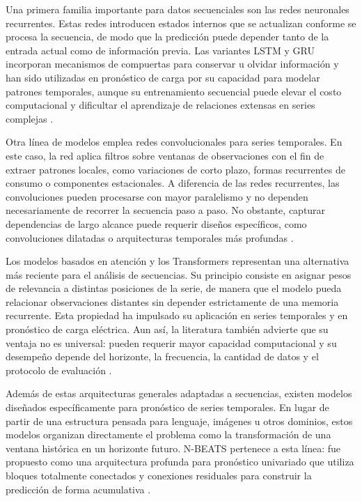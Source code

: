 Una primera familia importante para datos secuenciales son las redes neuronales recurrentes. Estas redes introducen estados internos que se actualizan conforme se procesa la secuencia, de modo que la predicción puede depender tanto de la entrada actual como de información previa. Las variantes LSTM y GRU incorporan mecanismos de compuertas para conservar u olvidar información y han sido utilizadas en pronóstico de carga por su capacidad para modelar patrones temporales, aunque su entrenamiento secuencial puede elevar el costo computacional y dificultar el aprendizaje de relaciones extensas en series complejas \parencite{eren2024}.

Otra línea de modelos emplea redes convolucionales para series temporales. En este caso, la red aplica filtros sobre ventanas de observaciones con el fin de extraer patrones locales, como variaciones de corto plazo, formas recurrentes de consumo o componentes estacionales. A diferencia de las redes recurrentes, las convoluciones pueden procesarse con mayor paralelismo y no dependen necesariamente de recorrer la secuencia paso a paso. No obstante, capturar dependencias de largo alcance puede requerir diseños específicos, como convoluciones dilatadas o arquitecturas temporales más profundas \parencite{eren2024}.

Los modelos basados en atención y los Transformers representan una alternativa más reciente para el análisis de secuencias. Su principio consiste en asignar pesos de relevancia a distintas posiciones de la serie, de manera que el modelo pueda relacionar observaciones distantes sin depender estrictamente de una memoria recurrente. Esta propiedad ha impulsado su aplicación en series temporales y en pronóstico de carga eléctrica. Aun así, la literatura también advierte que su ventaja no es universal: pueden requerir mayor capacidad computacional y su desempeño depende del horizonte, la frecuencia, la cantidad de datos y el protocolo de evaluación \parencites{eren2024,petropoulos2022}.

Además de estas arquitecturas generales adaptadas a secuencias, existen modelos diseñados específicamente para pronóstico de series temporales. En lugar de partir de una estructura pensada para lenguaje, imágenes u otros dominios, estos modelos organizan directamente el problema como la transformación de una ventana histórica en un horizonte futuro. N-BEATS pertenece a esta línea: fue propuesto como una arquitectura profunda para pronóstico univariado que utiliza bloques totalmente conectados y conexiones residuales para construir la predicción de forma acumulativa \parencite{oreshkin2020}.

